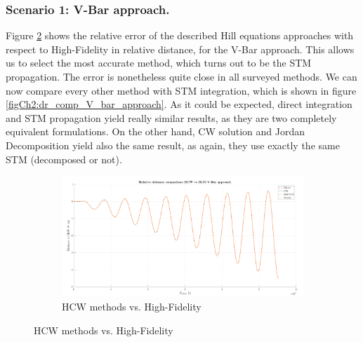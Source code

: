		\subsubsection{Scenario 1: V-Bar approach. }
		\indent Figure \ref{figCh2:dr_comp_HiFi_V_bar_approach} shows the relative error of the described Hill equations approaches with respect to High-Fidelity in relative distance, for the V-Bar approach. This allows us to select the most accurate method, which turns out to be the STM propagation. The error is nonetheless quite close in all surveyed methods. We can now compare every other method with STM integration, which is shown in figure \ref{figCh2:dr_comp_V_bar_approach}. As it could be expected, direct integration and STM propagation yield really similar results, as they are two completely equivalent formulations. On the other hand, CW solution and Jordan Decomposition yield also the same result, as again, they use exactly the same STM (decomposed or not).
		\begin{figure}[!htb]
		\begin{subfigure}[t]{.8\linewidth}
		\begin{changemargin}{-2.2cm}{-1cm}
		\begin{adjustbox}{width=1.2\textwidth}
		\centering\includegraphics[width = \linewidth]{Chapters/Chapter_02/dr_comp_V_bar_approach}
		\end{adjustbox}
		\end{changemargin}
		\caption{HCW methods vs. High-Fidelity}
		\label{figCh2:dr_comp_HiFi_V_bar_approach}
		\end{subfigure}
		\end{figure}

